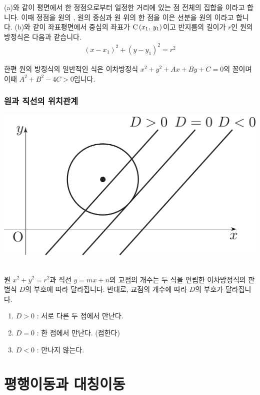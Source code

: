 (a)와 같이 평면에서 한 정점으로부터 일정한 거리에 있는 점 전체의 집합을 이라고 합니다. 이때 정점을 원의 , 원의 중심과 원 위의 한 점을 이은 선분을 원의 이라고 합니다. (b)와 같이 좌표평면에서 중심의 좌표가 $\xy[C]{x_1}{y_1}$이고 반지름의 길이가 $r$인 원의 방정식은 다음과 같습니다.
\begin{align*} (x-x_1)^2 + (y-y_1)^2 = r^2 \end{align*}

한편 원의 방정식의 일반적인 식은 이차방정식 $x^2 + y^2 + Ax + By + C = 0$의 꼴이며 이때 $A^2 + B^2 - 4C > 0$입니다.

\subsubsection{원과 직선의 위치관계}
\begin{center}
\includegraphics[scale=0.125]{pic0/pic163.pdf}\
\end{center}원 $x^2 + y^2 = r^2$과 직선 $y=mx+n$의 교점의 개수는 두 식을 연립한 이차방정식의 판별식 $D$의 부호에 따라 달라집니다. 반대로, 교점의 개수에 따라 $D$의 부호가 달라집니다.
\begin{justbox}
  \begin{enumerate}[label=\onum*]
    \item $D>0$ : 서로 다른 두 점에서 만난다.
    \item $D=0$ : 한 점에서 만난다. (접한다)
    \item $D<0$ : 만나지 않는다.
  \end{enumerate}
\end{justbox}
\clearpage
\section{평행이동과 대칭이동}

